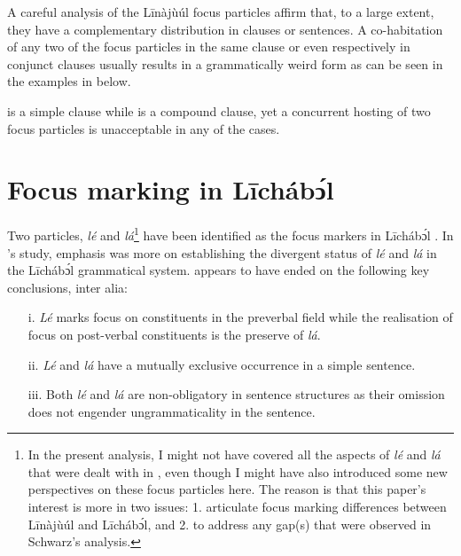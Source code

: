 \documentclass[output=paper,colorlinks,citecolor=brown]{langscibook}
\begin{document}
A careful analysis of the Līnàjùúl focus particles affirm that, to a large extent, they have a complementary distribution in clauses or sentences. A co-habitation of any two of the focus particles in the same clause or even respectively in conjunct clauses usually results in a grammatically weird form as can be seen in the examples in  below.

\ea%
    \label{ex:bisilki:21}
    \z
\z

 is a simple clause while  is a compound clause, yet a concurrent hosting of two focus particles is unacceptable in any of the cases.

\section{Focus marking in Līcháb\'{ͻ́}l}\label{sec:bisilki:7}

Two particles, \textit{lé} and \textit{lá}\footnote{In the present analysis, I might not have covered all the aspects of \textit{lé} and \textit{lá} that were dealt with in \citet{Schwarz2009}, even though I might have also introduced some new perspectives on these focus particles here. The reason is that this paper’s interest is more in two issues: 1. articulate focus marking differences between Līnàjùúl and Līcháb\'{ɔ}l, and 2. to address any gap(s) that were observed in Schwarz’s analysis.} have been identified as the focus markers in Līcháb\'{ɔ}l \citep{Schwarz2009}. In \citeauthor{Schwarz2009}’s study, emphasis was more on establishing the divergent status of \textit{lé} and \textit{lá} in the Līcháb\'{ɔ}l grammatical system. \citeauthor{Schwarz2009} appears to have ended on the following key conclusions, inter alia:

\begin{itemize}
    \item[i.]  \textit{Lé} marks focus on constituents in the preverbal field while the realisation of focus on post-verbal constituents is the preserve of \textit{lá}.
    \item[ii.] \textit{Lé} and \textit{lá} have a mutually exclusive occurrence in a simple sentence.
    \item[iii.] Both \textit{lé} and \textit{lá} are non-obligatory in sentence structures as their omission does not engender ungrammaticality in the sentence.
\end{itemize}
\end{document}
